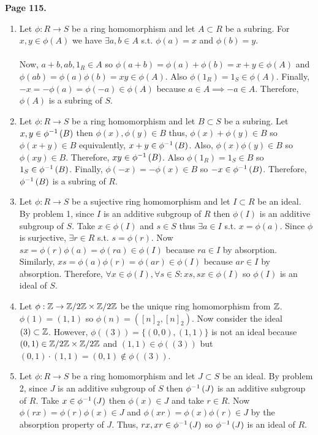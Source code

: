 \documentclass[12pt]{extarticle}
\begin{document}
\textbf{Page 115.} 
\begin{enumerate}
\item Let $\phi : R \rightarrow S$ be a ring homomorphism and let $A \subset R$ be a subring. For $x, y \in \phi(A)$ we have $\exists a,b \in A$ s.t. $\phi(a) = x$ and $\phi(b) = y$. \\ \\ Now, $a + b, ab, 1_R \in A$ so $\phi(a+b) = \phi(a) + \phi(b) = x + y \in \phi(A)$ and $\phi(ab) = \phi(a) \phi(b) = xy \in  \phi(A)$. Also $\phi(1_R) = 1_S \in \phi(A)$. Finally, $-x = -\phi(a) = \phi(-a) \in \phi(A)$ because $a \in A \implies -a \in A$. Therefore, $\phi(A)$ is a subring of $S$.

\item Let $\phi : R \rightarrow S$ be a ring homomorphism and let $B \subset S$ be a subring. Let $x, y \in \phi^{-1} \left( B \right)$ then $\phi(x), \phi(y) \in B$ thus, $\phi(x) + \phi(y) \in B$ so $\phi(x+y) \in B$ equivalently, $x+y \in \phi^{-1} \left( B \right)$. Also, $\phi(x)\phi(y) \in B$ so $\phi(xy) \in B$. Therefore, $xy \in \phi^{-1} \left( B \right)$. Also $\phi(1_R) = 1_S \in B$ so $1_S \in \phi^{-1} \left( B \right)$. Finally, $\phi(-x) = - \phi(x) \in B$ so $-x \in \phi^{-1} \left( B \right)$. Therefore, $\phi^{-1} \left( B \right)$ is a subring of $R$.

\item Let $\phi : R \rightarrow S$ be a sujective ring homomorphism and let $I \subset R$ be an ideal. By problem 1, since $I$ is an additive subgroup of $R$ then $\phi(I)$ is an additive subgroup of $S$. Take $x \in \phi(I)$ and $s \in S$ thus $\exists a \in I$ s.t. $x = \phi(a)$. Since $\phi$ is surjective, $\exists r \in R$ s.t. $s = \phi(r)$. Now $sx = \phi(r) \phi(a) = \phi(ra) \in \phi(I)$ because $ra \in I$ by absorption. Similarly, $xs = \phi(a) \phi(r) = \phi(ar) \in \phi(I)$ because $ar \in I$ by absorption. Therefore, $\forall x \in \phi(I), \forall s \in S : xs, sx \in \phi(I)$ so $\phi(I)$ is an ideal of $S$. 

\item Let $\phi : \mathbb{Z} \rightarrow \mathbb{Z}/ 2\mathbb{Z} \times \mathbb{Z}/2\mathbb{Z}$ be the unique ring homomorphism from $\mathbb{Z}$. $\phi(1) = (1,1)$ so $\phi(n) = ([n]_2, [n]_2)$. Now consider the ideal $(3) \subset \mathbb{Z}$. However, $\phi((3)) = \{(0, 0), (1, 1) \}$ is not an ideal because $(0, 1) \in \mathbb{Z}/ 2\mathbb{Z} \times \mathbb{Z}/2\mathbb{Z}$ and $(1, 1) \in \phi((3))$ but $(0, 1) \cdot (1, 1) = (0, 1) \notin \phi((3))$.

\item Let $\phi : R \rightarrow S$ be a ring homomorphism and let $J \subset S$ be an ideal. By problem 2, since $J$ is an additive subgroup of $S$ then $\phi^{-1} \left( J \right)$ is an additive subgroup of $R$. Take $x \in \phi^{-1} \left( J \right)$ then $\phi(x) \in J$ and take $r \in R$. Now $\phi(rx) = \phi(r) \phi(x) \in J$ and $\phi(xr) = \phi(x) \phi(r) \in J$ by the absorption property of $J$. Thus, $rx, xr \in \phi^{-1} \left( J \right)$ so $\phi^{-1} \left( J \right)$ is an ideal of $R$.


\end{enumerate}
\end{document}
